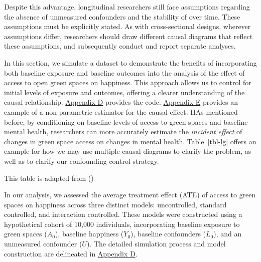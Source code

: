 \documentclass[
  singlecolumn]{article}
\begin{document}
Despite this advantage, longitudinal researchers still face assumptions
regarding the absence of unmeasured confounders and the stability of
over time. These assumptions must be explicitly stated. As with
cross-sectional designs, wherever assumptions differ, researchers should
draw different causal diagrams that reflect these assumptions, and
subsequently conduct and report separate analyses.

In this section, we simulate a dataset to demonstrate the benefits of
incorporating both baseline exposure and baseline outcomes into the
analysis of the effect of access to open green spaces on happiness. This
approach allows us to control for initial levels of exposure and
outcomes, offering a clearer understanding of the causal relationship.
\hyperref[appendix-d-simulation-of-different-confounding-control-strategies]{Appendix
D} provides the code.
\hyperref[appendix-e-non-parametric-estimation-of-average-treatment-effects-using-causal-forests-appendix-causal-forests]{Appendix
E} provides an example of a non-parametric estimator for the causal
effect. HAs mentioned before, by conditioning on baseline levels of
access to green spaces and baseline mental health, researchers can more
accurately estimate the \emph{incident effect} of changes in green space
access on changes in mental health. Table~\ref{tbl-lg} offers an example
for how we may use multiple causal diagrams to clarify the problem, as
well as to clarify our confounding control strategy.

\begin{table}

\caption{\label{tbl-lg}This table is adapted from
()}

\centering{

\examplelongitudinal

}

\end{table}%

In our analysis, we assessed the average treatment effect (ATE) of
access to green spaces on happiness across three distinct models:
uncontrolled, standard controlled, and interaction controlled. These
models were constructed using a hypothetical cohort of 10,000
individuals, incorporating baseline exposure to green spaces (\(A_0\)),
baseline happiness (\(Y_0\)), baseline confounders (\(L_0\)), and an
unmeasured confounder (\(U\)). The detailed simulation process and model
construction are delineated in
\hyperref[appendix-simulate-longitudinal-ate]{Appendix D}.
\end{document}
